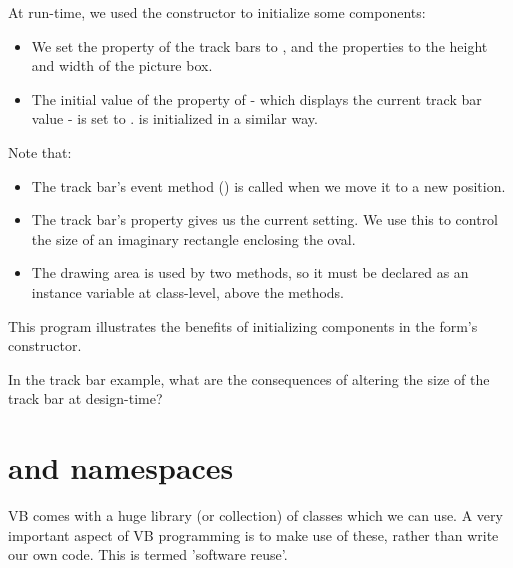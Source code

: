 		At run-time, we used the constructor to initialize some components:
		\begin{itemize}
			\item We set the  property of the track bars to , and the  properties to the height and width of the picture box.
			\item The initial value of the  property of  - which displays the current track bar value - is set to .  is initialized in a similar way.
		\end{itemize}
		Note that:
		\begin{itemize}
			\item The track bar's event method () is called when we move it to a new position.
			\item The track bar's  property gives us the current setting. We use this to control the size of an imaginary rectangle enclosing the oval.
			\item The drawing area is used by two methods, so it must be declared as an instance variable at class-level, above the methods.
		\end{itemize}
		This program illustrates the benefits of initializing components in the form's constructor.
		
		\begin{stqb}
			\begin{STQ}
				\item	In the track bar example, what are the consequences of altering the size of the track bar at design-time?
			\end{STQ}
		\end{stqb}

	\section{ and namespaces}
		VB comes with a huge library (or collection) of classes which we can use. A very important aspect of VB programming is to make use of these, rather than write our own code. This is termed 'software reuse'.

